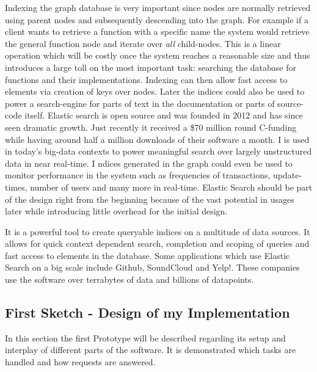 \documentclass[twoside, 11pt]{scrartcl}
\begin{document}
Indexing the graph database is very important since nodes are normally retrieved using parent nodes and subsequently descending into the graph. For example if a client wants to retrieve a function with a specific name the system would retrieve the general function node and iterate over \textit{all} child-nodes. This is a linear operation which will be costly once the system reaches a reasonable size and thus introduces a large toll on the most important task: searching the database for functions and their implementations. Indexing can then allow fast access to elements via creation of keys over nodes. Later the indices could also be used to power a search-engine for parts of text in the documentation or parts of source-code itself.
Elastic search is open source and was founded in 2012 and has since seen dramatic growth. Just recently it received a \$70 million round C-funding while having around half a million downloads of their software a month. \cite{link:esAbout} \cite{link:esTechCrunch} I is used in today's big-data contexts to power meaningful search over largely unstructured data in near real-time. 
I
ndices generated in the graph could even be used to monitor performance in the system such as frequencies of transactions, update-times, number of users and many more in real-time. Elastic Search should be part of the design right from the beginning because of the vast potential in usages later while introducing little overhead for the initial design.

It is a powerful tool to create queryable indices on a multitude of data sources. It allows for quick context dependent search, completion and scoping of queries and fast access to elements in the database.
Some applications which use Elastic Search on a big scale include Github, SoundCloud and Yelp!. These companies use the software over terrabytes of data and billions of datapoints. \cite{link:esUses}
	
\subsection{First Sketch - Design of my Implementation}
\label{sec:firstSketch}
In this section the first Prototype will be described regarding its setup and interplay of different parts of the software. It is demonstrated which tasks are handled and how requests are answered.
\end{document}
